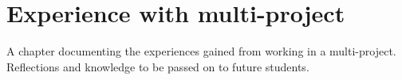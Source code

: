\chapter{Experience with multi-project}%
A chapter documenting the experiences gained from working in a multi-project. Reflections
and knowledge to be passed on to future students.
